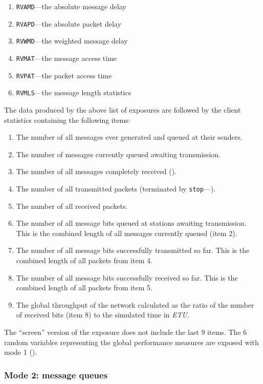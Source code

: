 \begin{enumerate}
\item
{\tt RVAMD}---the absolute message delay
\item
{\tt RVAPD}---the absolute packet delay
\item
{\tt RVWMD}---the weighted message delay
\item
{\tt RVMAT}---the message access time
\item
{\tt RVPAT}---the packet access time
\item
{\tt RVMLS}---the message length statistics
\end{enumerate}

The data produced by the above list of exposures are followed by the
client statistics containing the following items:

\begin{enumerate}
\item
The number of all messages ever generated and queued at their senders.
\item
The number of messages currently queued awaiting transmission.
\item
The number of all messages completely received ().
\item
The number of all transmitted packets (terminated by
{\tt stop}---).
\item
The number of all received packets.
\item
The number of all message bits queued at stations awaiting transmission.
This is the combined length of all messages currently queued (item 2).
\item
The number of all message bits successfully transmitted so far.
This is the combined length of all packets from item 4.
\item
The number of all message bits successfully received so far.
This is the combined length of all packets from item 5.
\item
The global throughput of the network calculated as the ratio of the
number of received bits (item 8) to the simulated time in {\em ETU}.
\end{enumerate}

The ``screen'' version of the exposure does not include the last 9 items.
The 6 random variables representing the global performance measures are
exposed with mode 1 ().

\subsubsection*{Mode 2: message queues}

